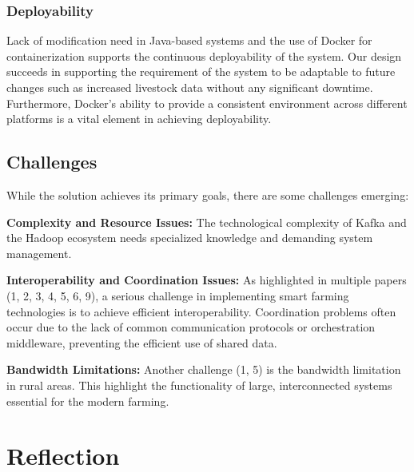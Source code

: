 \documentclass[conference]{IEEEtran}
\begin{document}
\subsubsection{Deployability}
Lack of modification need in Java-based systems and the use of Docker for containerization supports the continuous deployability of the system. Our design succeeds in supporting the requirement of the system to be adaptable to future changes such as increased livestock data without any significant downtime. Furthermore, Docker's ability to provide a consistent environment across different platforms is a vital element in achieving deployability.

\subsection{Challenges}
While the solution achieves its primary goals, there are some challenges emerging:

\textbf{Complexity and Resource Issues:} The technological complexity of Kafka and the Hadoop ecosystem needs specialized knowledge and demanding system management.

\textbf{Interoperability and Coordination Issues:} As highlighted in multiple papers (1, 2, 3, 4, 5, 6, 9), a serious challenge in implementing smart farming technologies is to achieve efficient interoperability. Coordination problems often occur due to the lack of common communication protocols or orchestration middleware, preventing the efficient use of shared data.

\textbf{Bandwidth Limitations:} Another challenge (1, 5) is the bandwidth limitation in rural areas. This highlight the functionality of large, interconnected systems essential for the modern farming.


\section{Reflection}
\end{document}
